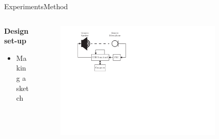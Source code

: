 \begin{frame}{Experiments}{Method}		
	\begin{columns}
		\begin{column}{0.5\textwidth}
			\textbf{Design set-up}
			\begin{itemize}
				\item Making a sketch
			\end{itemize}	
		\end{column}
		\begin{column}{0.5\textwidth} 
			\begin{figure}[h]
			    \includegraphics[width=0.85\textwidth]{figures/SimpleSetup}
			\end{figure}

		\end{column}
	\end{columns}
\end{frame}

